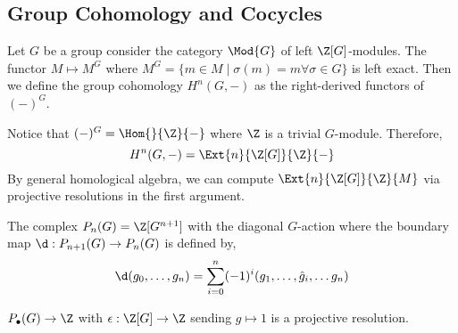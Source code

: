\documentclass[12pt]{article}
\begin{document}
\subsection{Group Cohomology and Cocycles}

\begin{defn}
Let $G$ be a group consider the category $\Mod{G}$ of left $\Z[G]$-modules. The functor $M \mapsto M^G$ where $M^G = \{ m \in M \mid \sigma(m) = m \forall \sigma \in G \}$ is left exact. Then we define the group cohomology $H^n(G, -)$ as the right-derived functors of $(-)^G$.
\end{defn}

\begin{rmk}
Notice that $(-)^G = \Hom{}{\Z}{-}$ where $\Z$ is a trivial $G$-module. Therefore, 
\[ H^n(G,-) = \Ext{n}{\Z[G]}{\Z}{-} \]
By general homological algebra, we can compute $\Ext{n}{\Z[G]}{\Z}{M}$ via projective resolutions in the first argument. 
\end{rmk}

\begin{defn}
The complex $P_n(G) = \Z[G^{n+1}]$ with the diagonal $G$-action where the boundary map $\d : P_{n+1}(G) \to P_n(G)$ is defined by,
\[ \d (g_0, \dots, g_n) = \sum_{i = 0}^{n} (-1)^i (g_1, \dots, \hat{g}_i, \dots g_n) \]
\end{defn}

\begin{prop}
$P_\bullet(G) \to \Z$ with $\epsilon : \Z[G] \to \Z$ sending $g \mapsto 1$ is a projective resolution.
\end{prop}
\end{document}
